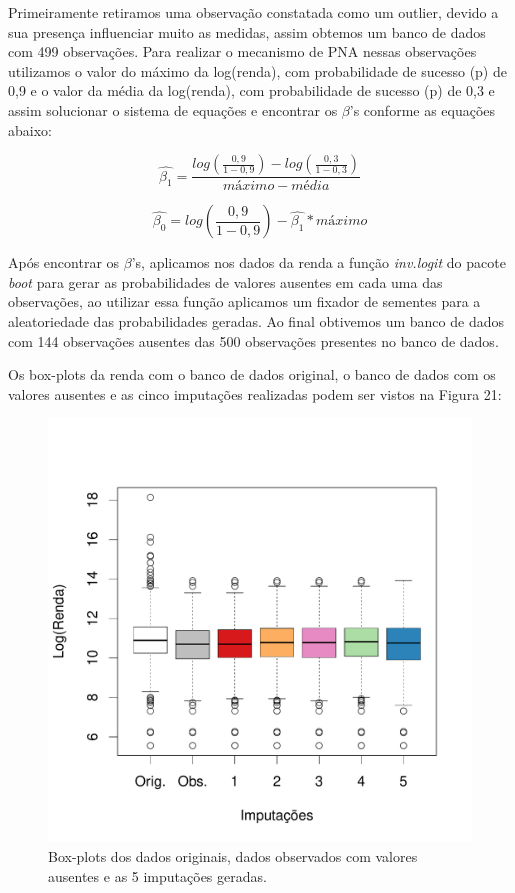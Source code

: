 \documentclass[]{article}
\begin{document}
Primeiramente retiramos uma observação constatada como um outlier,
devido a sua presença influenciar muito as medidas, assim obtemos um
banco de dados com 499 observações. Para realizar o mecanismo de PNA
nessas observações utilizamos o valor do máximo da log(renda), com
probabilidade de sucesso (p) de 0,9 e o valor da média da log(renda),
com probabilidade de sucesso (p) de 0,3 e assim solucionar o sistema de
equações e encontrar os \(\beta\)'s conforme as equações abaixo:

\[ \hat{\beta_1} = \frac{log( \frac{0,9}{1-0,9} ) - log( \frac{0,3}{1-0,3} )}{máximo - média} \]

\[ \hat{\beta_0} = log( \frac{0,9}{1-0,9} ) - \hat{\beta_1}*máximo \]

Após encontrar os \(\beta\)'s, aplicamos nos dados da renda a função
\emph{inv.logit} do pacote \emph{boot} para gerar as probabilidades de
valores ausentes em cada uma das observações, ao utilizar essa função
aplicamos um fixador de sementes para a aleatoriedade das probabilidades
geradas. Ao final obtivemos um banco de dados com 144 observações
ausentes das 500 observações presentes no banco de dados.

Os box-plots da renda com o banco de dados original, o banco de dados
com os valores ausentes e as cinco imputações realizadas podem ser
vistos na Figura 21:

\begin{figure}[H]

{\centering \includegraphics[width=0.6\linewidth]{p64-graf} 

}

\caption{Box-plots dos dados originais, dados observados com valores ausentes e as 5 imputações geradas.}\label{fig:unnamed-chunk-29}
\end{figure}
\end{document}
